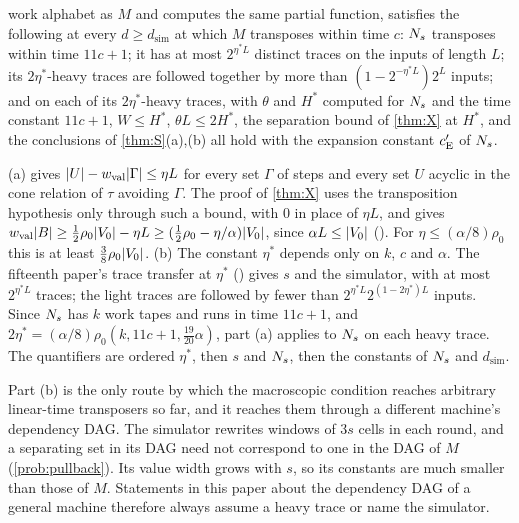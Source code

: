 \begin{theorem}
\begin{enumerate}[label=(\alph*)]
work alphabet as $M$ and computes the same partial function, satisfies the following at every $d\ge d_{\mathrm{sim}}$ at which $M$
transposes within time $c$: $N_s$ transposes within time $11c+1$; it has at most $2^{\eta^*L}$ distinct traces on the inputs of length
$L$; its $2\eta^*$-heavy traces are followed together by more than $(1-2^{-\eta^*L})2^L$ inputs; and on each of its $2\eta^*$-heavy traces,
with $\theta$ and $H^*$ computed for $N_s$ and the time constant $11c+1$, $W\le H^*$, $\theta L\le2H^*$, the separation bound of \cref{thm:X} at
$H^*$, and the conclusions of \cref{thm:S}(a),(b) all hold with the expansion constant $c_{\mathrm{E}}'$ of $N_s$.
\end{enumerate}
\end{theorem}

\begin{outline}
(a)  gives $\lvert U \rvert-w_{\mathrm{val}}\lvert \Gamma \rvert\le\eta L$ for every set $\Gamma$ of steps and every set $U$ acyclic in the cone
relation of $\tau$ avoiding $\Gamma$. The proof of \cref{thm:X} uses the transposition hypothesis only through such a bound, with $0$ in
place of $\eta L$, and gives $w_{\mathrm{val}}\lvert B \rvert\ge\frac12\rho_0\lvert V_0 \rvert-\eta L\ge(\frac12\rho_0-\eta/\alpha)\lvert V_0 \rvert$, since
$\alpha L\le\lvert V_0 \rvert$ (). For $\eta\le(\alpha/8)\rho_0$ this is at
least $\frac38\rho_0\lvert V_0 \rvert$. (b) The constant $\eta^*$ depends only on $k$, $c$
and $\alpha$. The fifteenth paper's trace transfer at $\eta^*$ () gives $s$ and the
simulator, with at most $2^{\eta^*L}$ traces; the light traces are followed by fewer than $2^{\eta^*L}2^{(1-2\eta^*)L}$ inputs. Since $N_s$ has
$k$ work tapes and runs in time $11c+1$, and $2\eta^*=(\alpha/8)\rho_0(k,11c+1,\tfrac{19}{20}\alpha)$, part (a) applies to $N_s$ on each heavy
trace.
The quantifiers are ordered $\eta^*$, then $s$ and $N_s$, then the constants of $N_s$ and $d_{\mathrm{sim}}$.
\end{outline}

Part (b) is the only route by which the macroscopic condition reaches arbitrary linear-time transposers so far, and it reaches them
through a different machine's dependency DAG. The simulator rewrites windows of $3s$ cells in each round, and a separating set in its
DAG need not correspond to one in the DAG of $M$ (\cref{prob:pullback}). Its value width grows with $s$, so its constants are much smaller
than those of $M$. Statements in this paper about the dependency DAG of a general machine therefore always assume a heavy trace or name the
simulator.

